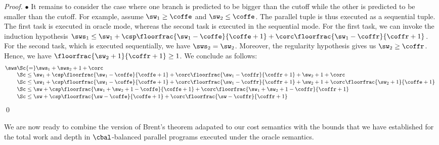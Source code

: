 \begin{proof}
$\bullet$  It remains to consider the case where one branch
is predicted to be bigger than the cutoff while the other
is predicted to be smaller than the cutoff. For example,
assume $\sw_1 \geq \coffe$ and $\sw_2 \leq \coffe$.
The parallel tuple is thus executed as a sequential tuple.
The first task is executed in oracle mode, whereas the
second task is executed in the sequential mode.
For the first task, we can invoke the induction hypothesis
$\sws_1 \leq \sw_1 + \csp \floorfrac{\sw_1-\coffe}{\coffe+1} + \corc \floorfrac{\sw_1-\coffr}{\coffr+1} $.
For the second task, which is executed sequentially, we have $\sws_2 = \sw_2$.
Moreover, the regularity hypothesis gives us $\sw_2 \geq \coffr$.
Hence, we have $\floorfrac{\sw_2+1}{\coffr+1} \geq 1$.
We conclude as follows:
%
$$\begin{array}{@{}l@{}ll}
\sws 
& \Sc{=} \sws_1 + \sws_2 + 1 + \corc \\ 
& \Sc\leq \sw_1 + \csp \floorfrac{\sw_1-\coffe}{\coffe+1} 
+ \corc \floorfrac{\sw_1-\coffr}{\coffr+1} + \sw_2 + 1 + \corc \vspace{1pt}\\
& \Sc\leq \sw_1 + \csp \floorfrac{\sw_1-\coffe}{\coffe+1} 
+ \corc \floorfrac{\sw_1-\coffr}{\coffr+1} + \sw_2 + 1 + \corc \floorfrac{\sw_2+1}{\coffe+1} \vspace{1pt}\\
& \Sc\leq \sw + \csp \floorfrac{\sw_1+\sw_2+1-\coffe}{\coffe+1} + \corc \floorfrac{\sw_1+\sw_2+1-\coffr}{\coffr+1} \vspace{1pt}\\
& \Sc\leq \sw + \csp \floorfrac{\sw-\coffe}{\coffe+1} + \corc \floorfrac{\sw-\coffr}{\coffr+1} \\
\end{array}$$
\qed
\end{proof}

We are now ready to combine the version of Brent's theorem
adapated to our cost semantics with the bounds that we
have established for the total work and depth 
in $\cbal$-balanced parallel programs executed
under the oracle semantics.

